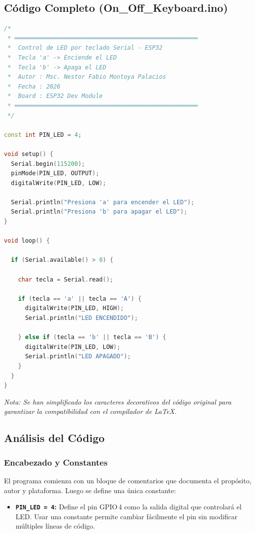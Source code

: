 \documentclass[12pt,a4paper]{article}
\begin{document}
\subsection{Código Completo (On\_Off\_Keyboard.ino)}
\begin{lstlisting}[language=C++, title=On\_Off\_Keyboard.ino]
/*
 * ════════════════════════════════════════════════════
 *  Control de LED por teclado Serial - ESP32
 *  Tecla 'a' -> Enciende el LED
 *  Tecla 'b' -> Apaga el LED
 *  Autor : Msc. Nestor Fabio Montoya Palacios
 *  Fecha : 2026
 *  Board : ESP32 Dev Module
 * ════════════════════════════════════════════════════
 */

const int PIN_LED = 4;

void setup() {
  Serial.begin(115200);
  pinMode(PIN_LED, OUTPUT);
  digitalWrite(PIN_LED, LOW);

  Serial.println("Presiona 'a' para encender el LED");
  Serial.println("Presiona 'b' para apagar el LED");
}

void loop() {

  if (Serial.available() > 0) {

    char tecla = Serial.read();

    if (tecla == 'a' || tecla == 'A') {
      digitalWrite(PIN_LED, HIGH);
      Serial.println("LED ENCENDIDO");

    } else if (tecla == 'b' || tecla == 'B') {
      digitalWrite(PIN_LED, LOW);
      Serial.println("LED APAGADO");
    }
  }
}
\end{lstlisting}
\textit{Nota: Se han simplificado los caracteres decorativos del código original para garantizar la compatibilidad con el compilador de \LaTeX.}

\subsection{Análisis del Código}

\subsubsection*{Encabezado y Constantes}
El programa comienza con un bloque de comentarios que documenta el propósito, autor y plataforma. Luego se define una única constante:
\begin{itemize}
    \item \textbf{\texttt{PIN\_LED = 4}:} Define el pin GPIO\,4 como la salida digital que controlará el LED. Usar una constante permite cambiar fácilmente el pin sin modificar múltiples líneas de código.
\end{itemize}
\end{document}
